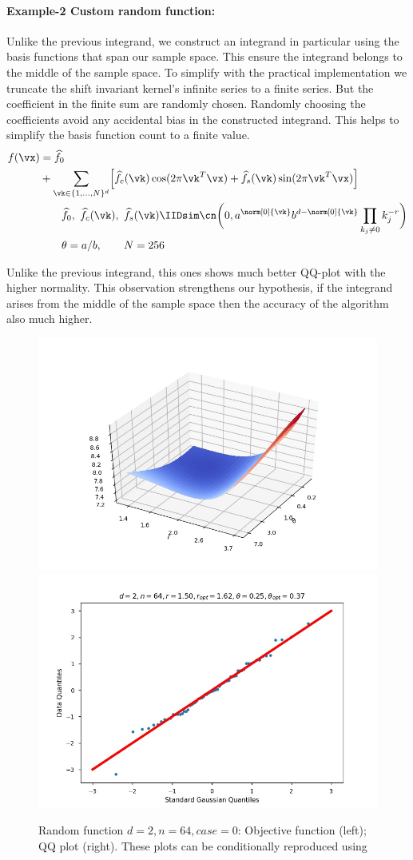 \paragraph{
Example-2 Custom random function:}

Unlike the previous integrand, we construct an integrand in particular using the basis functions that span our sample space. This ensure the integrand belongs to the middle of the sample space. To simplify with the practical implementation we truncate the shift invariant kernel's infinite series to a finite series. But the coefficient in the finite sum are randomly chosen. Randomly choosing the coefficients avoid any accidental bias in the constructed integrand. This helps to simplify the basis function count to a finite value. 
\[
\begin{aligned}
f(\vx) & = \widehat{f}_0  \\
& + \sum_{\vk \in \{1, \ldots, N\}^d} \Bigl[\widehat{f}_c(\vk) \cos(2\pi \vk^T \vx) + \widehat{f}_s(\vk)\sin(2\pi \vk^T \vx)\Bigr] \\
& \qquad  \widehat{f}_0, \  \widehat{f}_c(\vk), \ \widehat{f}_s(\vk) \IIDsim \cn\biggl(0,a^{\norm[0]{\vk}} b^{d-\norm[0]{\vk}}\prod_{k_j \ne 0} k_j^{-r}\biggr) \\
& \qquad \theta = a/b,  \qquad N = 256
\end{aligned}
\]%

Unlike the previous integrand, this ones shows much better QQ-plot with the higher normality. This observation strengthens our hypothesis, if the integrand arises from the middle of the sample space then the accuracy of the algorithm also much higher.
\begin{figure}[ht]
	\centering
	\includegraphics[width=0.45\linewidth]{BayesCub/figures/rand-ObjFun_n-64_d-2_r-150.0_th-25.0_case-0.jpg} \quad 
	\includegraphics[width=0.45\linewidth]{BayesCub/figures/rand-QQPlot_n-64_d-2_r-150.0_th-25.0_case-0.jpg}
	\caption{Random function $d=2, n=64, case=0$: Objective function (left);  QQ plot (right).  These plots can be conditionally reproduced using }
	\label{fig:rand_plots}
\end{figure}

